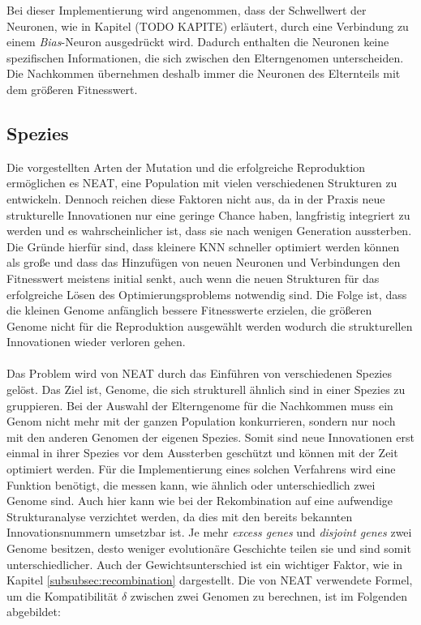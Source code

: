 Bei dieser Implementierung wird angenommen, dass der Schwellwert der Neuronen, wie in Kapitel (TODO KAPITE) erläutert, durch eine Verbindung zu einem \emph{Bias}-Neuron ausgedrückt wird. Dadurch enthalten die Neuronen keine spezifischen Informationen, die sich zwischen den Elterngenomen unterscheiden. Die Nachkommen übernehmen deshalb immer die Neuronen des Elternteils mit dem größeren Fitnesswert.
\subsection{Spezies}
\label{subsec:neat_species}
Die vorgestellten Arten der Mutation und die erfolgreiche Reproduktion ermöglichen es \ac{NEAT}, eine Population mit vielen verschiedenen Strukturen zu entwickeln. Dennoch reichen diese Faktoren nicht aus, da in der Praxis neue strukturelle Innovationen nur eine geringe Chance haben, langfristig integriert zu werden und es wahrscheinlicher ist, dass sie nach wenigen Generation aussterben. Die Gründe hierfür sind, dass kleinere \ac{KNN} schneller optimiert werden können als große und dass das Hinzufügen von neuen Neuronen und Verbindungen den Fitnesswert meistens initial senkt, auch wenn die neuen Strukturen für das erfolgreiche Lösen des Optimierungsproblems notwendig sind. Die Folge ist, dass die kleinen Genome anfänglich bessere Fitnesswerte erzielen, die größeren Genome nicht für die Reproduktion ausgewählt werden wodurch die strukturellen Innovationen wieder verloren gehen.
\\\\
Das Problem wird von \ac{NEAT} durch das Einführen von verschiedenen Spezies gelöst. Das Ziel ist, Genome, die sich strukturell ähnlich sind in einer Spezies zu gruppieren. Bei der Auswahl der Elterngenome für die Nachkommen muss ein Genom nicht mehr mit der ganzen Population konkurrieren, sondern nur noch mit den anderen Genomen der eigenen Spezies. Somit sind neue Innovationen erst einmal in ihrer Spezies vor dem Aussterben geschützt und können mit der Zeit optimiert werden. Für die Implementierung eines solchen Verfahrens wird eine Funktion benötigt, die messen kann, wie ähnlich oder unterschiedlich zwei Genome sind. Auch hier kann wie bei der Rekombination auf eine aufwendige Strukturanalyse verzichtet werden, da dies mit den bereits bekannten Innovationsnummern umsetzbar ist. Je mehr \emph{excess genes} und \emph{disjoint genes} zwei Genome besitzen, desto weniger evolutionäre Geschichte teilen sie und sind somit unterschiedlicher. Auch der Gewichtsunterschied ist ein wichtiger Faktor, wie in Kapitel \ref{subsubsec:recombination} dargestellt. Die von \ac{NEAT} verwendete Formel, um die Kompatibilität $\delta$ zwischen zwei Genomen zu berechnen, ist im Folgenden abgebildet:
